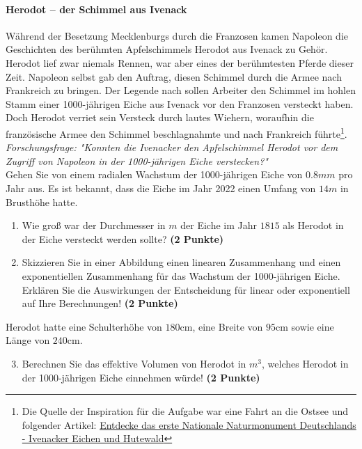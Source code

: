 \documentclass[a4paper, 9pt]{scrartcl}\usepackage[]{graphicx}\usepackage[]{xcolor}
\begin{document}
\paragraph{Herodot – der Schimmel aus Ivenack}

W{\"a}hrend der Besetzung Mecklenburgs durch die Franzosen kamen Napoleon die
Geschichten des ber{\"u}hmten Apfelschimmels Herodot aus Ivenack zu
Geh{\"o}r. Herodot lief zwar niemals Rennen, war aber eines der ber{\"u}hmtesten
Pferde dieser Zeit. Napoleon selbst gab den Auftrag, diesen
Schimmel durch die Armee nach Frankreich zu bringen. Der Legende nach
sollen Arbeiter den Schimmel im hohlen Stamm einer 1000-j{\"a}hrigen Eiche aus Ivenack vor
den Franzosen versteckt haben. Doch Herodot verriet sein Versteck durch
lautes Wiehern, woraufhin die franz{\"o}sische Armee den Schimmel
beschlagnahmte und nach Frankreich f{\"u}hrte\footnote{Die Quelle der Inspiration
  für die Aufgabe war eine Fahrt an die Ostsee und folgender Artikel:
  \href{https://www.wald-mv.de/landingpage/ivenacker-eichen/}{Entdecke das erste Nationale Naturmonument Deutschlands - Ivenacker Eichen und Hutewald}}. \\



\textit{Forschungsfrage: "Konnten die Ivenacker den Apfelschimmel Herodot
  vor dem Zugriff von Napoleon in der 1000-j{\"a}hrigen Eiche verstecken?"} \\

Gehen Sie von einem radialen Wachstum der 1000-j{\"a}hrigen Eiche von
$0.8mm$ pro Jahr aus. Es ist bekannt, dass die Eiche im
Jahr 2022 einen Umfang von $14m$ in Brusth{\"o}he hatte.

\begin{enumerate}
\item Wie gro{\ss} war der Durchmesser in $m$ der Eiche im Jahr $1815$ als
  Herodot in der Eiche versteckt werden sollte?
  \textbf{(2 Punkte)}
\item Skizzieren Sie in einer Abbildung einen linearen Zusammenhang und einen
exponentiellen Zusammenhang f{\"u}r das Wachstum der 1000-j{\"a}hrigen Eiche. Erkl{\"a}ren Sie die
Auswirkungen der Entscheidung f{\"u}r linear oder exponentiell auf Ihre
Berechnungen! \textbf{(2 Punkte)}
\end{enumerate}
 
Herodot hatte eine Schulterh{\"o}he von $180$cm, eine Breite von
$95$cm sowie eine L{\"a}nge von  $240$cm.

\begin{enumerate}
  \setcounter{enumi}{2}
\item Berechnen Sie das effektive Volumen von Herodot in $m^3$, welches
  Herodot in der 1000-j{\"a}hrigen Eiche einnehmen w{\"u}rde! \textbf{(2 Punkte)}
\end{enumerate}
\end{document}
